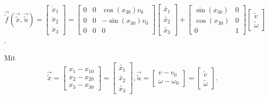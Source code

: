 \begin{equation}
    \overrightarrow{\widetilde{f}}(\overrightarrow{\widetilde{x}}, \overrightarrow{\widetilde{u}}) =
    \begin{bmatrix*}
        \dot{x}_1 \\
        \dot{x}_2 \\
        \dot{x}_3
    \end{bmatrix*}
    =
    \begin{bmatrix*}
        0 & 0 & \cos(x_{30})v_0 \\
        0 & 0 & -\sin(x_{30})v_0 \\
        0 & 0 & 0
    \end{bmatrix*}
    \begin{bmatrix*}
        \widetilde{x_1} \\
        \widetilde{x_2} \\
        \widetilde{x_3} 
    \end{bmatrix*}
    +
    \begin{bmatrix*}
        \sin(x_{30}) & 0 \\
        \cos(x_{30}) & 0 \\
        0 & 1
    \end{bmatrix*}
    \begin{bmatrix*}
        \widetilde{v} \\
        \widetilde{\omega}
    \end{bmatrix*}
\end{equation}.

Mit
\begin{equation*}
    \overrightarrow{\widetilde{x}} =
    \begin{bmatrix*} 
        x_1 - x_{10} \\
        x_2 - x_{20} \\
        x_3 - x_{30} 
    \end{bmatrix*}
    =
    \begin{bmatrix*} 
        \widetilde{x_1} \\
        \widetilde{x_2} \\
        \widetilde{x_3} 
    \end{bmatrix*},
    \overrightarrow{\widetilde{u}} =
    \begin{bmatrix*}
        v - v_0\\
        \omega - \omega_0
    \end{bmatrix*}
    =
    \begin{bmatrix*}
        \widetilde{v} \\
        \widetilde{\omega}
    \end{bmatrix*}.
\end{equation*}

